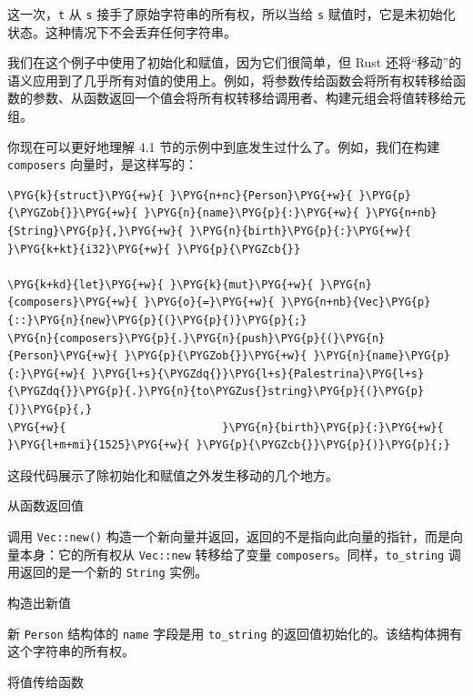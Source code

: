 这一次，\texttt{t} 从 \texttt{s} 接手了原始字符串的所有权，所以当给 \texttt{s} 赋值时，它是未初始化状态。这种情况下不会丢弃任何字符串。

我们在这个例子中使用了初始化和赋值，因为它们很简单，但 Rust 还将“移动”的语义应用到了几乎所有对值的使用上。例如，将参数传给函数会将所有权转移给函数的参数、从函数返回一个值会将所有权转移给调用者、构建元组会将值转移给元组。

你现在可以更好地理解 4.1 节的示例中到底发生过什么了。例如，我们在构建 \texttt{composers} 向量时，是这样写的：

\begin{Verbatim}[commandchars=\\\{\},breaklines=true,breakanywhere=true,fontsize=\codefont,xleftmargin=17bp]
\PYG{k}{struct}\PYG{+w}{ }\PYG{n+nc}{Person}\PYG{+w}{ }\PYG{p}{\PYGZob{}}\PYG{+w}{ }\PYG{n}{name}\PYG{p}{:}\PYG{+w}{ }\PYG{n+nb}{String}\PYG{p}{,}\PYG{+w}{ }\PYG{n}{birth}\PYG{p}{:}\PYG{+w}{ }\PYG{k+kt}{i32}\PYG{+w}{ }\PYG{p}{\PYGZcb{}}

\PYG{k+kd}{let}\PYG{+w}{ }\PYG{k}{mut}\PYG{+w}{ }\PYG{n}{composers}\PYG{+w}{ }\PYG{o}{=}\PYG{+w}{ }\PYG{n+nb}{Vec}\PYG{p}{::}\PYG{n}{new}\PYG{p}{(}\PYG{p}{)}\PYG{p}{;}
\PYG{n}{composers}\PYG{p}{.}\PYG{n}{push}\PYG{p}{(}\PYG{n}{Person}\PYG{+w}{ }\PYG{p}{\PYGZob{}}\PYG{+w}{ }\PYG{n}{name}\PYG{p}{:}\PYG{+w}{ }\PYG{l+s}{\PYGZdq{}}\PYG{l+s}{Palestrina}\PYG{l+s}{\PYGZdq{}}\PYG{p}{.}\PYG{n}{to\PYGZus{}string}\PYG{p}{(}\PYG{p}{)}\PYG{p}{,}
\PYG{+w}{                        }\PYG{n}{birth}\PYG{p}{:}\PYG{+w}{ }\PYG{l+m+mi}{1525}\PYG{+w}{ }\PYG{p}{\PYGZcb{}}\PYG{p}{)}\PYG{p}{;}
\end{Verbatim}

这段代码展示了除初始化和赋值之外发生移动的几个地方。

\begin{mySidenote}
从函数返回值
\end{mySidenote}

调用 \texttt{Vec::new()} 构造一个新向量并返回，返回的不是指向此向量的指针，而是向量本身：它的所有权从 \texttt{Vec::new} 转移给了变量 \texttt{composers}。同样，\texttt{to\_string} 调用返回的是一个新的 \texttt{String} 实例。

\begin{mySidenote}
构造出新值
\end{mySidenote}

新 \texttt{Person} 结构体的 \texttt{name} 字段是用 \texttt{to\_string} 的返回值初始化的。该结构体拥有这个字符串的所有权。

\begin{mySidenote}
将值传给函数
\end{mySidenote}

